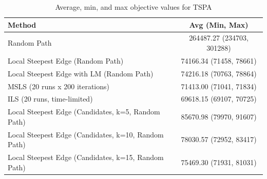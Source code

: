\begin{table}[h!]
\centering
\begin{tabular}{lc}
\hline
Method & Avg (Min, Max) \\
\hline
Random Path & 264487.27 (234703, 301288) \\
Local Steepest Edge (Random Path) & 74166.34 (71458, 78661) \\
Local Steepest Edge with LM (Random Path) & 74216.18 (70763, 78864) \\
MSLS (20 runs x 200 iterations) & 71413.00 (71041, 71834) \\
ILS (20 runs, time-limited) & 69618.15 (69107, 70725) \\
Local Steepest Edge (Candidates, k=5, Random Path) & 85670.98 (79970, 91607) \\
Local Steepest Edge (Candidates, k=10, Random Path) & 78030.57 (72952, 83417) \\
Local Steepest Edge (Candidates, k=15, Random Path) & 75469.30 (71931, 81031) \\
\hline
\end{tabular}
\caption{Average, min, and max objective values for TSPA}
\label{tab:TSPA_scores}
\end{table}
